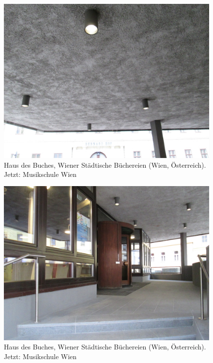 \documentclass[a4paper,
fontsize=11pt,
oneside,
numbers=noperiodatend,
parskip=half-,
bibliography=totoc,
final
]{scrartcl}
\begin{document}
\begin{figure}[htbp]
\centering
\includegraphics{./img/028.jpg}
\caption{Haus des Buches, Wiener Städtische Büchereien (Wien,
Österreich). Jetzt: Musikschule
Wien}
\end{figure}

\begin{figure}[htbp]
\centering
\includegraphics{./img/029.jpg}
\caption{Haus des Buches, Wiener Städtische Büchereien (Wien,
Österreich). Jetzt: Musikschule
Wien}
\end{figure}
\end{document}
